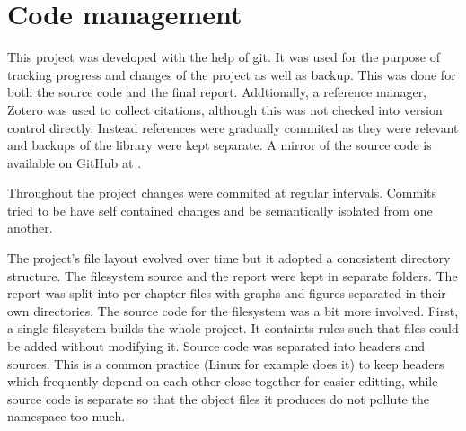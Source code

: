     \section{Code management}

        This project was developed with the help of git. It was used for the
        purpose of tracking progress and changes of the project as well as
        backup. This was done for both the source code and the final report.
        Addtionally, a reference manager, Zotero \cite{zotero} was used to
        collect citations, although this was not checked into version control
        directly. Instead references were gradually commited as they were
        relevant and backups of the library were kept separate. A mirror of
        the source code is available on GitHub at \cite{source_repository}.

        Throughout the project changes were commited at regular intervals.
        Commits tried to be have self contained changes and be semantically
        isolated from one another.

        The project's file layout evolved over time but it adopted a
        concsistent directory structure. The filesystem source and the report
        were kept in separate folders. The report was split into per-chapter
        files with graphs and figures separated in their own directories. The
        source code for the filesystem was a bit more involved. First, a single
        filesystem builds the whole project. It containts rules such that files
        could be added without modifying it. Source code was separated into
        headers and sources. This is a common practice (Linux
        \cite{Linux_source} for example does it) to keep headers which
        frequently depend on each other close together for easier editting,
        while source code is separate so that the object files it produces do
        not pollute the namespace too much.
